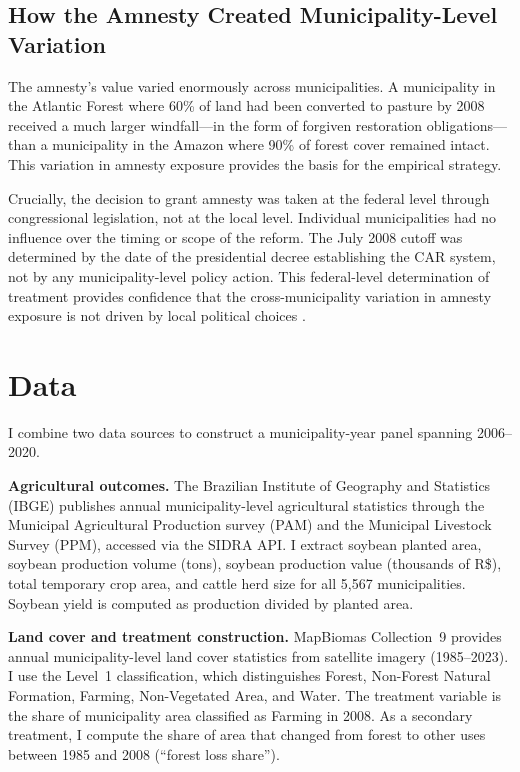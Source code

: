 \documentclass[12pt]{article}
\begin{document}
\subsection{How the Amnesty Created Municipality-Level Variation}

The amnesty's value varied enormously across municipalities. A municipality in the Atlantic Forest where 60\% of land had been converted to pasture by 2008 received a much larger windfall---in the form of forgiven restoration obligations---than a municipality in the Amazon where 90\% of forest cover remained intact. This variation in amnesty exposure provides the basis for the empirical strategy.

Crucially, the decision to grant amnesty was taken at the federal level through congressional legislation, not at the local level. Individual municipalities had no influence over the timing or scope of the reform. The July 2008 cutoff was determined by the date of the presidential decree establishing the CAR system, not by any municipality-level policy action. This federal-level determination of treatment provides confidence that the cross-municipality variation in amnesty exposure is not driven by local political choices \citep{ferreira2014brazil}.


\section{Data}

I combine two data sources to construct a municipality-year panel spanning 2006--2020.

\textbf{Agricultural outcomes.} The Brazilian Institute of Geography and Statistics (IBGE) publishes annual municipality-level agricultural statistics through the Municipal Agricultural Production survey (PAM) and the Municipal Livestock Survey (PPM), accessed via the SIDRA API. I extract soybean planted area, soybean production volume (tons), soybean production value (thousands of R\$), total temporary crop area, and cattle herd size for all 5,567 municipalities. Soybean yield is computed as production divided by planted area.

\textbf{Land cover and treatment construction.} MapBiomas Collection~9 provides annual municipality-level land cover statistics from satellite imagery (1985--2023). I use the Level~1 classification, which distinguishes Forest, Non-Forest Natural Formation, Farming, Non-Vegetated Area, and Water. The treatment variable is the share of municipality area classified as Farming in 2008. As a secondary treatment, I compute the share of area that changed from forest to other uses between 1985 and 2008 (``forest loss share'').
\end{document}
